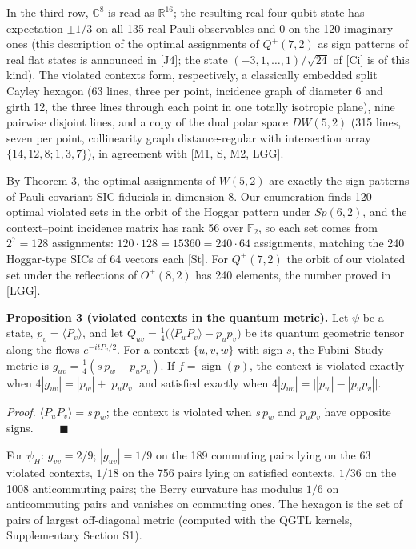 \documentclass[11pt,a4paper]{article}
\begin{document}
In the third row, \(\mathbb{C}^8\) is read as \(\mathbb{R}^{16}\); the resulting real four-qubit state has
expectation \(\pm 1/3\) on all 135 real Pauli observables and \(0\) on the 120 imaginary ones (this
description of the optimal assignments of \(Q^+(7,2)\) as sign patterns of real flat states is
announced in {[}J4{]}; the state \((-3,1,\dots,1)/\sqrt{24}\) of {[}Ci{]} is of this kind). The violated contexts
form, respectively, a classically embedded split Cayley
hexagon (63 lines, three per point, incidence graph of diameter 6 and girth 12, the three lines through
each point in one totally isotropic plane), nine pairwise disjoint lines, and a copy of the dual polar
space \(DW(5,2)\) (315 lines, seven per point, collinearity graph distance-regular with intersection
array \(\{14,12,8;1,3,7\}\)), in agreement with {[}M1, S, M2, LGG{]}.

By Theorem 3, the optimal assignments of \(W(5,2)\) are exactly the sign patterns of Pauli-covariant SIC
fiducials in dimension 8. Our enumeration finds 120 optimal violated sets in the orbit of the Hoggar
pattern under \(Sp(6,2)\), and the context--point incidence matrix has rank 56 over \(\mathbb{F}_2\), so each
set comes from \(2^7 = 128\) assignments: \(120 \cdot 128 = 15360 = 240 \cdot 64\) assignments, matching the
240 Hoggar-type SICs of 64 vectors each {[}St{]}. For \(Q^+(7,2)\) the orbit of our violated set under the
reflections of \(O^+(8,2)\) has 240 elements, the number proved in {[}LGG{]}.

\textbf{Proposition 3 (violated contexts in the quantum metric).} Let \(\psi\) be a state, \(p_v = \langle P_v\rangle\),
and let \(Q_{uv} = \tfrac14\big(\langle P_u P_v\rangle - p_u p_v\big)\) be its quantum geometric tensor along
the flows \(e^{-itP_v/2}\). For a context \(\{u, v, w\}\) with sign \(s\), the Fubini--Study metric is
\(g_{uv} = \tfrac14 (s\,p_w - p_u p_v)\). If \(f = \operatorname{sign}(p)\), the context is violated exactly when
\(4|g_{uv}| = |p_w| + |p_u p_v|\) and satisfied exactly when \(4|g_{uv}| = \big||p_w| - |p_u p_v|\big|\).

\emph{Proof.} \(\langle P_uP_v\rangle = s\,p_w\); the context is violated when \(s\,p_w\) and \(p_u p_v\) have opposite
signs. \(\qquad\blacksquare\)

For \(\psi_H\): \(g_{vv} = 2/9\); \(|g_{uv}| = 1/9\) on the 189 commuting pairs lying on the 63 violated contexts,
\(1/18\) on the 756 pairs lying on satisfied contexts, \(1/36\) on the 1008 anticommuting pairs; the Berry
curvature has modulus \(1/6\) on anticommuting pairs and vanishes on commuting ones. The hexagon is the
set of pairs of largest off-diagonal metric (computed with the QGTL kernels, Supplementary Section S1).
\end{document}
